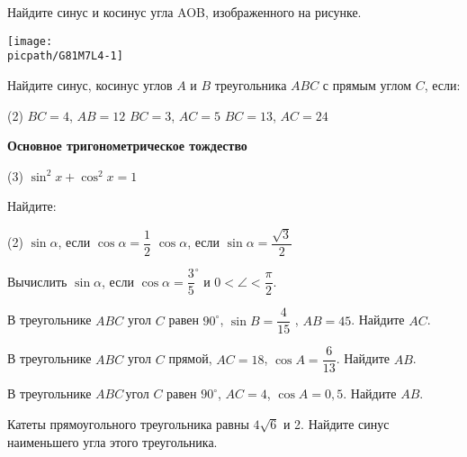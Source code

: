 \begin{class}[number=4]
	\begin{listofex}
		\item 
		\begin{minipage}[t]{\bodywidth}
		Найдите синус и косинус угла AOB, изображенного на рисунке.
	\end{minipage}
	\hspace{0.02\linewidth}
	\begin{minipage}[t]{\picwidth}
		\texttt{[image: \\picpath/G81M7L4-1]}
	\end{minipage}
	\item Найдите синус, косинус углов \( A \) и \( B \) треугольника \( ABC \) с прямым углом \( C \), если:
	\begin{tasks}(2)
		\task \( BC=4 \), \( AB=12 \)
		\task \( BC=3 \), \( AC=5 \)
		\task \( BC=13 \), \( AC=24 \)
	\end{tasks}
	\end{listofex}
		\begin{definit}
			\textbf{Основное тригонометрическое тождество }
			\begin{tasks}(3)
				\task[]
				\task[] \( \sin ^{2} x+\cos ^{2} x=1  \)
				\task[]
			\end{tasks} 
		\end{definit}
		\begin{listofex}[resume]
		\item Найдите:
		\begin{tasks}(2)
			\task \( \sin\alpha \), если \( \cos\alpha=\dfrac{1}{2} \)
			\task \( \cos\alpha \), если \( \sin\alpha=\dfrac{\sqrt{3}}{2} \)
		\end{tasks}
		\item Вычислить \( \sin \alpha \), если \( \cos \alpha =\dfrac{3}{5}^{\circ} \)	и \( 0 < \angle < \dfrac{\pi}{2} \).
		\item В треугольнике \( ABC  \) угол \( C \) равен \( 90^{\circ} \), \( \sin B = \dfrac{4}{15} \) , \( AB=45 \). Найдите \( AC \).
		\item В треугольнике \( ABC \) угол \( C \) прямой, \( AC=18 \), \( \cos A=\dfrac{6}{13} \). Найдите \( AB \).
		\item В треугольнике \( ABC \) угол \( C \) равен \( 90^{\circ} \), \( AC  =  4 \),  \(  \cos A = 0,5 \). Найдите \( AB \).  
		\item Катеты прямоугольного треугольника равны \( 4\sqrt{6} \) и 2. Найдите синус наименьшего угла этого треугольника.

\end{listofex}
\end{class}
